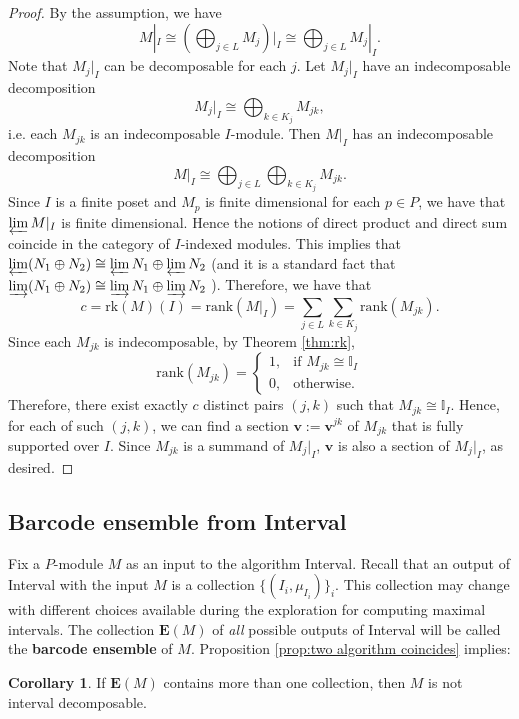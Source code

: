 \documentclass[11pt]{article}
\theoremstyle{definition}
\newtheorem{corollary}[theorem]{Corollary}
\newcommand{\bE}{\mathbf{E}}
\newcommand{\bv}{\mathbf{v}}
\newcommand{\rank}{\mathrm{rank}}
\newcommand{\I}{\mathbb{I}}
\newcommand{\Pb}{P}
\newcommand{\rk}{\mathrm{rk}}
\begin{document}
\begin{proof}By the assumption, we have
\[M|_I\cong \left(\bigoplus_{j\in L}M_j\right)\Big|_I\cong \bigoplus_{j\in L}M_j|_I.\]
Note that $M_j|_I$ can be decomposable for each $j$. Let $M_j|_I$ have an indecomposable decomposition \[M_j|_I\cong \bigoplus_{k\in K_j}M_{jk},\]
i.e. each $M_{jk}$ is an indecomposable $I$-module. Then $M|_I$ has an indecomposable decomposition \[M|_I\cong\bigoplus_{j\in L}\bigoplus_{k\in K_j}M_{jk}.\]
 Since $I$ is a finite poset and $M_p$ is finite dimensional for each $p\in \Pb$, we have that $\varprojlim M|_I$ is finite dimensional. Hence the notions of direct product and direct sum coincide in the category of $I$-indexed modules. This implies that $\varprojlim (N_1\oplus N_2)\cong \varprojlim N_1 \oplus \varprojlim N_2$ (and it is a standard fact that $\varinjlim (N_1\oplus N_2)\cong \varinjlim N_1 \oplus \varinjlim N_2$ \cite[Theorem V.5.1]{mac2013categories}). Therefore, we have that \[c=\rk(M)(I)=\rank(M|_I)=\sum_{j\in L}\sum_{k\in K_j}\rank\left(M_{jk}\right).\]
Since each $M_{jk}$ is indecomposable, by Theorem \ref{thm:rk}, \[\rank(M_{jk})=\begin{cases}1,&\mbox{if $M_{jk}\cong \I_{I}$} \\0,&\mbox{otherwise.}
\end{cases}
\]
Therefore, there exist exactly $c$ distinct pairs $(j,k)$ such that $M_{jk}\cong \I_I$. Hence, for each of such $(j,k)$, we can find a section $\bv:=\bv^{jk}$ of $M_{jk}$ that is fully supported over $I$. Since $M_{jk}$ is a summand of $M_j|_I$, $\bv$ is also a section of $M_j|_I$, as desired. 
\end{proof}


\subsection{Barcode ensemble from {\sc Interval}}

Fix a $P$-module $M$ as an input to the algorithm {\sc Interval}. Recall that an output of {\sc Interval} with the input $M$ is a collection $\{(I_i,\mu_{I_i})\}_i$.
This collection may change with different choices available during the exploration for computing maximal intervals. The collection $\bE(M)$  of \emph{all} possible outputs of {\sc Interval} will be called the \textbf{barcode ensemble} of $M$. Proposition \ref{prop:two algorithm coincides} implies:

\begin{corollary} If $\bE(M)$ contains more than one collection, then $M$ is not interval decomposable. 
\end{corollary}
\end{document}
